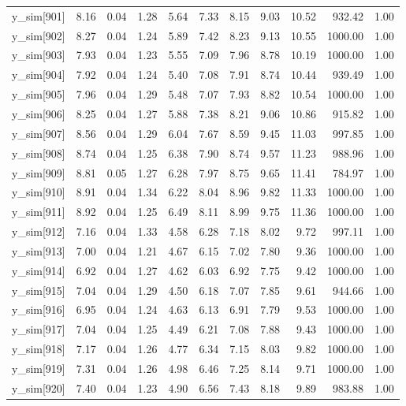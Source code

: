 \begin{table}[ht]
\begin{tabular}{rrrrrrrrrrr}
  y\_sim[901] & 8.16 & 0.04 & 1.28 & 5.64 & 7.33 & 8.15 & 9.03 & 10.52 & 932.42 & 1.00 \\ 
  y\_sim[902] & 8.27 & 0.04 & 1.24 & 5.89 & 7.42 & 8.23 & 9.13 & 10.55 & 1000.00 & 1.00 \\ 
  y\_sim[903] & 7.93 & 0.04 & 1.23 & 5.55 & 7.09 & 7.96 & 8.78 & 10.19 & 1000.00 & 1.00 \\ 
  y\_sim[904] & 7.92 & 0.04 & 1.24 & 5.40 & 7.08 & 7.91 & 8.74 & 10.44 & 939.49 & 1.00 \\ 
  y\_sim[905] & 7.96 & 0.04 & 1.29 & 5.48 & 7.07 & 7.93 & 8.82 & 10.54 & 1000.00 & 1.00 \\ 
  y\_sim[906] & 8.25 & 0.04 & 1.27 & 5.88 & 7.38 & 8.21 & 9.06 & 10.86 & 915.82 & 1.00 \\ 
  y\_sim[907] & 8.56 & 0.04 & 1.29 & 6.04 & 7.67 & 8.59 & 9.45 & 11.03 & 997.85 & 1.00 \\ 
  y\_sim[908] & 8.74 & 0.04 & 1.25 & 6.38 & 7.90 & 8.74 & 9.57 & 11.23 & 988.96 & 1.00 \\ 
  y\_sim[909] & 8.81 & 0.05 & 1.27 & 6.28 & 7.97 & 8.75 & 9.65 & 11.41 & 784.97 & 1.00 \\ 
  y\_sim[910] & 8.91 & 0.04 & 1.34 & 6.22 & 8.04 & 8.96 & 9.82 & 11.33 & 1000.00 & 1.00 \\ 
  y\_sim[911] & 8.92 & 0.04 & 1.25 & 6.49 & 8.11 & 8.99 & 9.75 & 11.36 & 1000.00 & 1.00 \\ 
  y\_sim[912] & 7.16 & 0.04 & 1.33 & 4.58 & 6.28 & 7.18 & 8.02 & 9.72 & 997.11 & 1.00 \\ 
  y\_sim[913] & 7.00 & 0.04 & 1.21 & 4.67 & 6.15 & 7.02 & 7.80 & 9.36 & 1000.00 & 1.00 \\ 
  y\_sim[914] & 6.92 & 0.04 & 1.27 & 4.62 & 6.03 & 6.92 & 7.75 & 9.42 & 1000.00 & 1.00 \\ 
  y\_sim[915] & 7.04 & 0.04 & 1.29 & 4.50 & 6.18 & 7.07 & 7.85 & 9.61 & 944.66 & 1.00 \\ 
  y\_sim[916] & 6.95 & 0.04 & 1.24 & 4.63 & 6.13 & 6.91 & 7.79 & 9.53 & 1000.00 & 1.00 \\ 
  y\_sim[917] & 7.04 & 0.04 & 1.25 & 4.49 & 6.21 & 7.08 & 7.88 & 9.43 & 1000.00 & 1.00 \\ 
  y\_sim[918] & 7.17 & 0.04 & 1.26 & 4.77 & 6.34 & 7.15 & 8.03 & 9.82 & 1000.00 & 1.00 \\ 
  y\_sim[919] & 7.31 & 0.04 & 1.26 & 4.98 & 6.46 & 7.25 & 8.14 & 9.71 & 1000.00 & 1.00 \\ 
  y\_sim[920] & 7.40 & 0.04 & 1.23 & 4.90 & 6.56 & 7.43 & 8.18 & 9.89 & 983.88 & 1.00 \\ 

\end{tabular}
\end{table}
